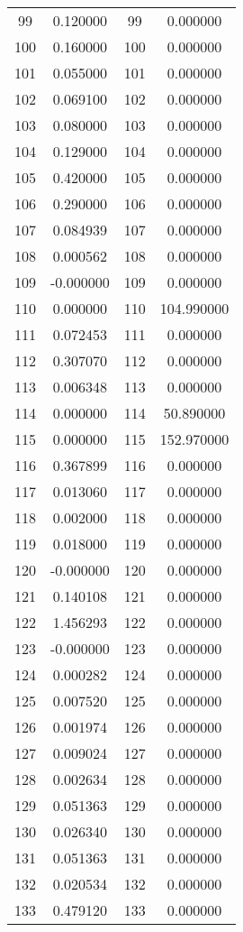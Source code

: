 \documentclass[12pt]{article}
\begin{document}
\begin{longtable}{@{}cccc@{}}
99 & 0.120000 & 99 & 0.000000 \\
100 & 0.160000 & 100 & 0.000000 \\
101 & 0.055000 & 101 & 0.000000 \\
102 & 0.069100 & 102 & 0.000000 \\
103 & 0.080000 & 103 & 0.000000 \\
104 & 0.129000 & 104 & 0.000000 \\
105 & 0.420000 & 105 & 0.000000 \\
106 & 0.290000 & 106 & 0.000000 \\
107 & 0.084939 & 107 & 0.000000 \\
108 & 0.000562 & 108 & 0.000000 \\
109 & -0.000000 & 109 & 0.000000 \\
110 & 0.000000 & 110 & 104.990000 \\
111 & 0.072453 & 111 & 0.000000 \\
112 & 0.307070 & 112 & 0.000000 \\
113 & 0.006348 & 113 & 0.000000 \\
114 & 0.000000 & 114 & 50.890000 \\
115 & 0.000000 & 115 & 152.970000 \\
116 & 0.367899 & 116 & 0.000000 \\
117 & 0.013060 & 117 & 0.000000 \\
118 & 0.002000 & 118 & 0.000000 \\
119 & 0.018000 & 119 & 0.000000 \\
120 & -0.000000 & 120 & 0.000000 \\
121 & 0.140108 & 121 & 0.000000 \\
122 & 1.456293 & 122 & 0.000000 \\
123 & -0.000000 & 123 & 0.000000 \\
124 & 0.000282 & 124 & 0.000000 \\
125 & 0.007520 & 125 & 0.000000 \\
126 & 0.001974 & 126 & 0.000000 \\
127 & 0.009024 & 127 & 0.000000 \\
128 & 0.002634 & 128 & 0.000000 \\
129 & 0.051363 & 129 & 0.000000 \\
130 & 0.026340 & 130 & 0.000000 \\
131 & 0.051363 & 131 & 0.000000 \\
132 & 0.020534 & 132 & 0.000000 \\
133 & 0.479120 & 133 & 0.000000 \\

\end{longtable}
\end{document}
